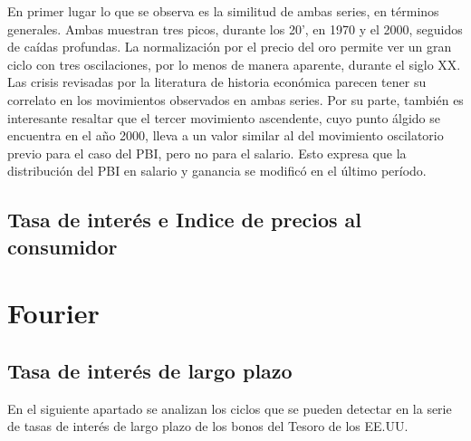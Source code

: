 \documentclass[a4paper]{article}
\begin{document}
En primer lugar lo que se observa es la similitud de ambas series, en términos generales. Ambas muestran tres picos, durante los 20', en 1970 y el 2000, seguidos de caídas profundas. La normalización por el precio del oro permite ver un gran ciclo con tres oscilaciones, por lo menos de manera aparente, durante el siglo XX. Las crisis revisadas por la literatura de historia económica parecen tener su correlato en los movimientos observados en ambas series. Por su parte, también es interesante resaltar que el tercer movimiento ascendente, cuyo punto álgido se encuentra en el año 2000, lleva a un valor similar al del movimiento oscilatorio previo para el caso del PBI, pero no para el salario. Esto expresa que la distribución del PBI en salario y ganancia se modificó en el último período. 


\subsection{Tasa de interés e Indice de precios al consumidor}


\section{Fourier}

\subsection{Tasa de interés de largo plazo}

En el siguiente apartado se analizan los ciclos que se pueden detectar en la serie de tasas de interés de largo plazo de los bonos del Tesoro de los EE.UU.
\end{document}
